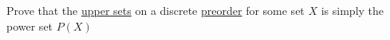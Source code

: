 
Prove that the \href{doc/1 math/Seven Sketches in Compositionality/1 Chapter 1: Generative Effects/3 Preorders/Upper set}{upper sets} on a discrete \href{doc/1 math/Seven Sketches in Compositionality/1 Chapter 1: Generative Effects/3 Preorders/1 Preorder}{preorder} for some set $X$ is simply the power set $P(X)$